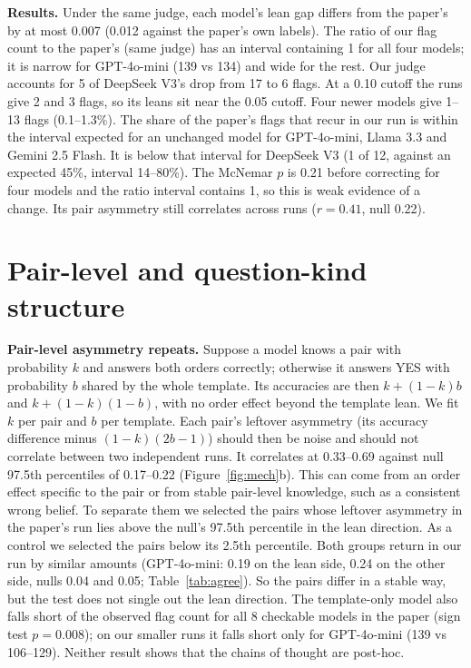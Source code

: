\documentclass[10pt]{article}
\begin{document}
\textbf{Results.} Under the same judge, each model's lean gap differs from the paper's by at most 0.007 (0.012 against the paper's own labels). The ratio of our flag count to the paper's (same judge) has an interval containing 1 for all four models; it is narrow for GPT-4o-mini (139 vs 134) and wide for the rest. Our judge accounts for 5 of DeepSeek V3's drop from 17 to 6 flags. At a 0.10 cutoff the runs give 2 and 3 flags, so its leans sit near the 0.05 cutoff. Four newer models give 1--13 flags (0.1--1.3\%). The share of the paper's flags that recur in our run is within the interval expected for an unchanged model for GPT-4o-mini, Llama 3.3 and Gemini 2.5 Flash. It is below that interval for DeepSeek V3 (1 of 12, against an expected 45\%, interval 14--80\%). The McNemar $p$ is 0.21 before correcting for four models and the ratio interval contains 1, so this is weak evidence of a change. Its pair asymmetry still correlates across runs ($r = 0.41$, null 0.22).

\section{Pair-level and question-kind structure}
\textbf{Pair-level asymmetry repeats.} Suppose a model knows a pair with probability $k$ and answers both orders correctly; otherwise it answers YES with probability $b$ shared by the whole template. Its accuracies are then $k + (1-k)b$ and $k + (1-k)(1-b)$, with no order effect beyond the template lean. We fit $k$ per pair and $b$ per template. Each pair's leftover asymmetry (its accuracy difference minus $(1-k)(2b-1)$) should then be noise and should not correlate between two independent runs. It correlates at 0.33--0.69 against null 97.5th percentiles of 0.17--0.22 (Figure~\ref{fig:mech}b). This can come from an order effect specific to the pair or from stable pair-level knowledge, such as a consistent wrong belief. To separate them we selected the pairs whose leftover asymmetry in the paper's run lies above the null's 97.5th percentile in the lean direction. As a control we selected the pairs below its 2.5th percentile. Both groups return in our run by similar amounts (GPT-4o-mini: 0.19 on the lean side, 0.24 on the other side, nulls 0.04 and 0.05; Table~\ref{tab:agree}). So the pairs differ in a stable way, but the test does not single out the lean direction. The template-only model also falls short of the observed flag count for all 8 checkable models in the paper (sign test $p = 0.008$); on our smaller runs it falls short only for GPT-4o-mini (139 vs 106--129). Neither result shows that the chains of thought are post-hoc.
\end{document}
